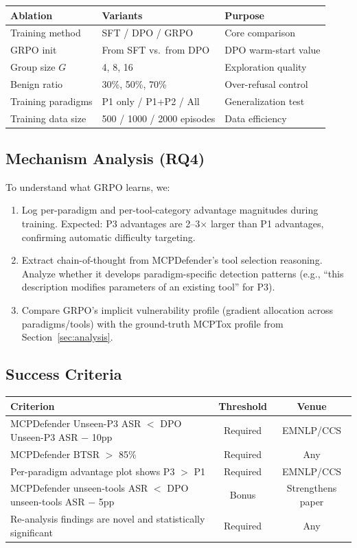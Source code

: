 \documentclass[11pt,a4paper]{article}
\begin{document}
\begin{table}[h]
\centering
\small
\begin{tabular}{lll}
\toprule
\textbf{Ablation} & \textbf{Variants} & \textbf{Purpose} \\
\midrule
Training method & SFT / DPO / GRPO & Core comparison \\
GRPO init & From SFT vs.\ from DPO & DPO warm-start value \\
Group size $G$ & 4, 8, 16 & Exploration quality \\
Benign ratio & 30\%, 50\%, 70\% & Over-refusal control \\
Training paradigms & P1 only / P1+P2 / All & Generalization test \\
Training data size & 500 / 1000 / 2000 episodes & Data efficiency \\
\bottomrule
\end{tabular}
\end{table}

\subsection{Mechanism Analysis (RQ4)}

To understand what GRPO learns, we:
\begin{enumerate}[nosep]
    \item Log per-paradigm and per-tool-category advantage magnitudes during training. Expected: P3 advantages are 2--3$\times$ larger than P1 advantages, confirming automatic difficulty targeting.
    \item Extract chain-of-thought from MCPDefender's tool selection reasoning. Analyze whether it develops paradigm-specific detection patterns (e.g., ``this description modifies parameters of an existing tool'' for P3).
    \item Compare GRPO's implicit vulnerability profile (gradient allocation across paradigms/tools) with the ground-truth MCPTox profile from Section~\ref{sec:analysis}.
\end{enumerate}

\subsection{Success Criteria}

\begin{table}[h]
\centering
\small
\begin{tabular}{lcc}
\toprule
\textbf{Criterion} & \textbf{Threshold} & \textbf{Venue} \\
\midrule
MCPDefender Unseen-P3 ASR $<$ DPO Unseen-P3 ASR $-$ 10pp & Required & EMNLP/CCS \\
MCPDefender BTSR $>$ 85\% & Required & Any \\
Per-paradigm advantage plot shows P3 $>$ P1 & Required & EMNLP/CCS \\
MCPDefender unseen-tools ASR $<$ DPO unseen-tools ASR $-$ 5pp & Bonus & Strengthens paper \\
Re-analysis findings are novel and statistically significant & Required & Any \\
\bottomrule
\end{tabular}
\end{table}
\end{document}
